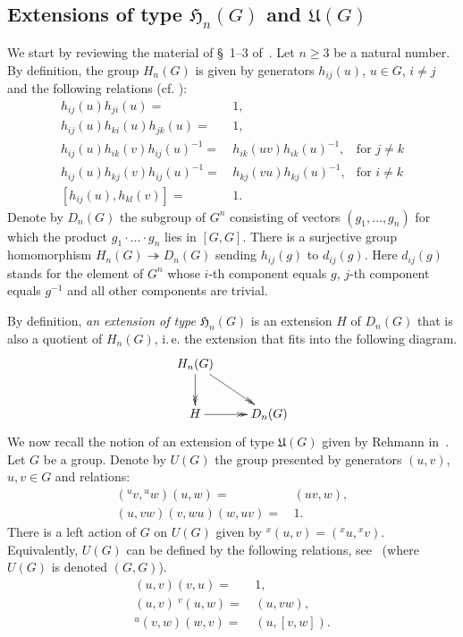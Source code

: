 \documentclass[oneside, 12pt]{amsart}
\theoremstyle{plain}
\numberwithin{equation}{section}
\numberwithin{lemma}{section}
\theoremstyle{remark}
\theoremstyle{definition}
\begin{document}
\subsection{Extensions of type $\mathfrak{H}_n(G)$ and $\mathfrak{U}(G)$} \label{ssec:extensions}
We start by reviewing the material of \S~1--3 of~\cite{Reh78}. 
Let $n \geq 3$ be a natural number. By definition, the group $H_n(G)$ is given by generators
$h_{ij}(u)$, $u\in G$, $i\neq j$ and the following relations (cf. \cite[H1--H5~of~\S~2]{Reh78}):
\begin{align}
h_{ij}(u) h_{ji}(u)                = &\, 1,                        &                     \tag{H1} \label{RH1} \\
h_{ij}(u) h_{ki}(u) h_{jk}(u)      = &\, 1,                        &                     \tag{H2} \label{RH2} \\
h_{ij}(u) h_{ik}(v) h_{ij}(u)^{-1} = &\, h_{ik}(uv) h_{ik}(u)^{-1},& \text{for } j\neq k \tag{H3} \label{RH3} \\
h_{ij}(u) h_{kj}(v) h_{ij}(u)^{-1} = &\, h_{kj}(vu) h_{kj}(u)^{-1},& \text{for } i\neq k \tag{H4} \label{RH4} \\
[h_{ij}(u), h_{kl}(v)]             = &\, 1.                        &                     \tag{H5} \label{RH5} \end{align}
Denote by $D_n(G)$ the subgroup of $G^n$ consisting of vectors
 $(g_1,\ldots, g_n)$ for which the product $g_1\cdot \ldots \cdot g_n$ lies in $[G, G]$.
There is a surjective group homomorphism $H_n(G) \twoheadrightarrow D_n(G)$ sending $h_{ij}(g)$ to $d_{ij}(g)$.
Here $d_{ij}(g)$ stands for the element of $G^n$ whose
 $i$-th component equals $g$, $j$-th component equals $g^{-1}$ and all other components are trivial.

By definition, {\it an extension of type $\mathfrak{H}_n(G)$} is an extension $H$ of $D_n(G)$ that is also a quotient of $H_n(G)$, i.\,e. 
 the extension that fits into the following diagram.
\[ \xymatrix{ H_n(G) \ar@{->>}[rd] \ar@{->>}[d] & \\ H \ar@{->>}[r] & D_n(G)} \]
We now recall the notion of an extension of type $\mathfrak{U}(G)$ given by Rehmann in~\cite[\S~1]{Reh78}.
Let $G$ be a group. Denote by $U(G)$ the group presented by generators $(u, v)$, $u,v\in G$ and relations:
\begin{align}
 ({}^{u} v, {}^{u}w) (u,  w) = &\, (uv, w), \tag{U1} \label{U1} \\
 (u,  vw) (v,  wu) (w,  uv)  = &\, 1.       \tag{U2} \label{U2}
\end{align}
There is a left action of $G$ on $U(G)$ given by ${}^x (u, v) = ({}^{x}u, {}^{x}v).$
Equivalently, $U(G)$ can be defined by the following relations, see~\cite[p.~8]{De76} (where $U(G)$ is denoted $(G, G)$).
\begin{align} 
 (u, v) (v, u)     = &\, 1,          \label{U4} \\
 (u, v) \ {}^v(u, w) = &\, (u, vw),  \label{U6} \\
 {}^u(v, w)(w, v)  = &\, (u, [v, w]).\label{U9} \end{align}
 
\end{document}

